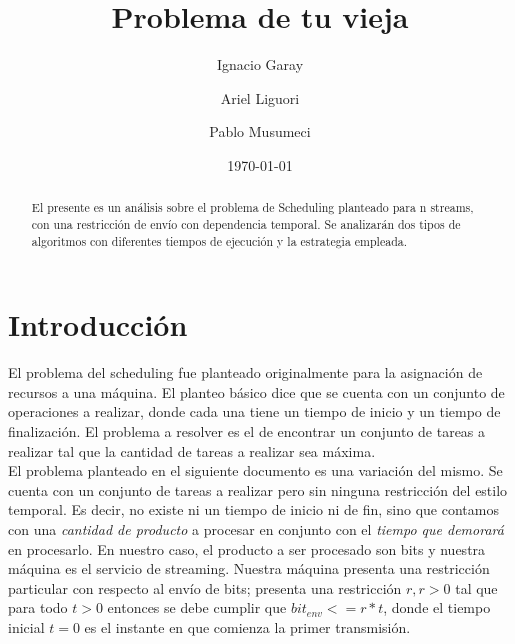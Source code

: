 \documentclass[12pt]{article}
\title{Problema de tu vieja}
\author{
        Ignacio Garay \\
                \and
        Ariel Liguori\\
        	\and
	Pablo Musumeci
}
\date{\today}
\begin{document}
\maketitle

\begin{abstract}
El presente es un an\'alisis sobre el problema de Scheduling planteado para n streams, con una restricci\'on de env\'io
con dependencia temporal. Se analizar\'an dos tipos de algoritmos con diferentes tiempos de ejecuci\'on y la estrategia empleada.
\end{abstract}

\newpage
\tableofcontents
\newpage

\section{Introducci\'on}\label{intro}
El problema del scheduling fue planteado originalmente para la asignaci\'on de recursos a una m\'aquina. El planteo
b\'asico dice que se cuenta con un conjunto de operaciones a realizar, donde cada una tiene un tiempo de inicio y un
tiempo de finalizaci\'on. El problema a resolver es el de encontrar un conjunto de tareas a realizar tal que la cantidad
de tareas a realizar sea m\'axima.\\
El problema planteado en el siguiente documento es una variaci\'on del mismo. Se cuenta con un conjunto de tareas a realizar pero sin ninguna restricci\'on del estilo temporal. Es decir, no existe ni un tiempo de inicio ni de fin, sino que
contamos con una \emph{cantidad de producto} a procesar en conjunto con el \emph{tiempo que demorar\'a} en procesarlo.
 En nuestro caso, el producto a ser procesado son bits y nuestra m\'aquina es el servicio de streaming. Nuestra m\'aquina presenta una restricci\'on particular con respecto al env\'io de bits; presenta una restricci\'on $r, r > 0$ tal que para todo $t > 0$ entonces se debe cumplir que $bit_{env} <= r * t$, donde el tiempo inicial $t = 0$ es el instante en que comienza la primer transmisi\'on.
\newpage
\end{document}

